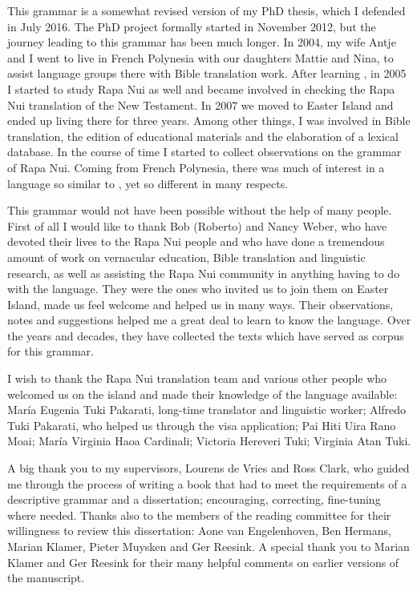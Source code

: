  
This grammar is a somewhat revised version of my PhD thesis, which I defended in July 2016. The PhD project formally started in November 2012, but the journey leading to this grammar has been much longer. In 2004, my wife Antje and I went to live in French Polynesia with our daughters Mattie and Nina, to assist language groups there with Bible translation work. After learning , in 2005 I started to study Rapa Nui as well and became involved in checking the Rapa Nui translation of the New Testament. In 2007 we moved to Easter Island and ended up living there for three years. Among other things, I was involved in Bible translation, the edition of educational materials and the elaboration of a lexical database. In the course of time I started to collect observations on the grammar of Rapa Nui. Coming from French Polynesia, there was much of interest in a language so similar to , yet so different in many respects. 

This grammar would not have been possible without the help of many people. First of all I would like to thank Bob (Roberto) and Nancy Weber, who have devoted their lives to the Rapa Nui people and who have done a tremendous amount of work on vernacular education, Bible translation and linguistic research, as well as assisting the Rapa Nui community in anything having to do with the language. They were the ones who invited us to join them on Easter Island, made us feel welcome and helped us in many ways. Their observations, notes and suggestions helped me a great deal to learn to know the language. Over the years and decades, they have collected the texts which have served as corpus for this grammar.

I wish to thank the Rapa Nui translation team and various other people who welcomed us on the island and made their knowledge of the language available: María Eugenia Tuki Pakarati, long-time translator and linguistic worker; Alfredo Tuki Pakarati, who helped us through the visa application; Pai Hiti {\ꞌ}Uira Rano Moai; María Virginia Haoa Cardinali; Victoria Hereveri Tuki; Virginia Atan Tuki.

A big thank you to my supervisors, Lourens de Vries and Ross Clark, who guided me through the process of writing a book that had to meet the requirements of a descriptive grammar and a dissertation; encouraging, correcting, fine-tuning where needed. Thanks also to the members of the reading committee for their willingness to review this dissertation: Aone van Engelenhoven, Ben Hermans, Marian Klamer, Pieter Muysken and Ger Reesink. A special thank you to Marian Klamer and Ger Reesink for their many helpful comments on earlier versions of the manuscript.

